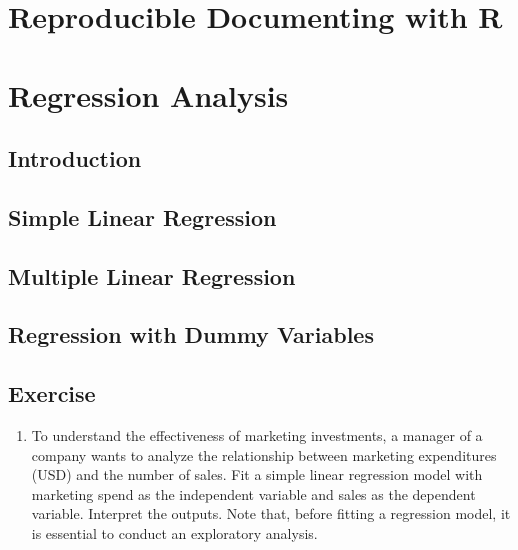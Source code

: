 \documentclass[
  letterpaper,
  DIV=11,
  numbers=noendperiod]{scrreprt}
\providecommand{\tightlist}{%
  \setlength{\itemsep}{0pt}\setlength{\parskip}{0pt}}\usepackage{longtable,booktabs,array}
\begin{document}

\hypertarget{reproducible-documenting-with-r}{%
\chapter{Reproducible Documenting with
R}\label{reproducible-documenting-with-r}}


\hypertarget{regression-analysis}{%
\chapter{Regression Analysis}\label{regression-analysis}}

\hypertarget{introduction}{%
\section{Introduction}\label{introduction}}

\hypertarget{simple-linear-regression}{%
\section{Simple Linear Regression}\label{simple-linear-regression}}

\hypertarget{multiple-linear-regression}{%
\section{Multiple Linear Regression}\label{multiple-linear-regression}}

\hypertarget{regression-with-dummy-variables}{%
\section{Regression with Dummy
Variables}\label{regression-with-dummy-variables}}

\hypertarget{exercise-6}{%
\section{Exercise}\label{exercise-6}}

\begin{enumerate}
\def\labelenumi{\arabic{enumi}.}
\tightlist
\item
  To understand the effectiveness of marketing investments, a manager of
  a company wants to analyze the relationship between marketing
  expenditures (USD) and the number of sales. Fit a simple linear
  regression model with marketing spend as the independent variable and
  sales as the dependent variable. Interpret the outputs. Note that,
  before fitting a regression model, it is essential to conduct an
  exploratory analysis.
\end{enumerate}
\end{document}
